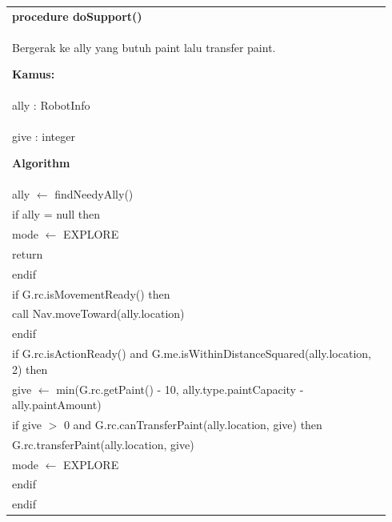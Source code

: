 \documentclass{article}
\newenvironment{pseudobox}
{
\centering
\begin{longtable}{|p{0.94\linewidth}|}
\hline
}
{
\\ \hline
\end{longtable}
\vspace{0.05cm}
}
\begin{document}
\begin{pseudobox}
\textbf{procedure doSupport()} \\
{ Bergerak ke ally yang butuh paint lalu transfer paint. }

\textbf{Kamus:} \\
\hspace*{1em} ally : RobotInfo \\
\hspace*{1em} give : integer

\textbf{Algorithm} \\
\hspace*{1em} ally $\leftarrow$ findNeedyAlly() \\

\hspace*{1em} if ally = null then \\
\hspace*{2em} mode $\leftarrow$ EXPLORE \\
\hspace*{2em} return \\
\hspace*{1em} endif \\

\hspace*{1em} if G.rc.isMovementReady() then \\
\hspace*{2em} call Nav.moveToward(ally.location) \\
\hspace*{1em} endif \\

\hspace*{1em} if G.rc.isActionReady() and G.me.isWithinDistanceSquared(ally.location, 2) then \\
\hspace*{2em} give $\leftarrow$ min(G.rc.getPaint() - 10, ally.type.paintCapacity - ally.paintAmount) \\
\hspace*{2em} if give $>$ 0 and G.rc.canTransferPaint(ally.location, give) then \\
\hspace*{3em} G.rc.transferPaint(ally.location, give) \\
\hspace*{3em} mode $\leftarrow$ EXPLORE \\
\hspace*{2em} endif \\
\hspace*{1em} endif
\end{pseudobox}
\end{document}
